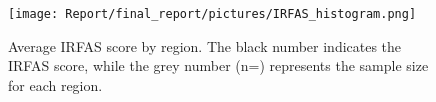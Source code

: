 \begin{figure}[htbp]
    \centering
    \texttt{[image: Report/final\_report/pictures/IRFAS\_histogram.png]}
    \caption{Average IRFAS score by region. The black number indicates the IRFAS score, while the grey number (n=) represents the sample size for each region. }
    \label{fig:IRFAS_histogram}
\end{figure}
